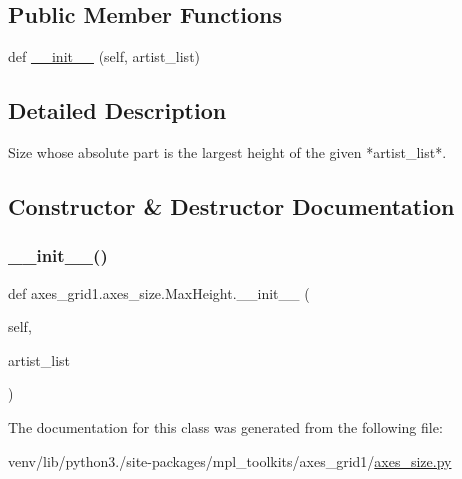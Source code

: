 \subsection*{Public Member Functions}
\begin{DoxyCompactItemize}
\item 
def \hyperlink{classaxes__grid1_1_1axes__size_1_1MaxHeight_a203fc68a5ed81a9d932896d10b47048a}{\+\_\+\+\_\+init\+\_\+\+\_\+} (self, artist\+\_\+list)
\end{DoxyCompactItemize}


\subsection{Detailed Description}
\begin{DoxyVerb}Size whose absolute part is the largest height of the given *artist_list*.
\end{DoxyVerb}
 

\subsection{Constructor \& Destructor Documentation}
\mbox{\label{classaxes__grid1_1_1axes__size_1_1MaxHeight_a203fc68a5ed81a9d932896d10b47048a}} 
\subsubsection{\texorpdfstring{\+\_\+\+\_\+init\+\_\+\+\_\+()}{\_\_init\_\_()}}
{\footnotesize\ttfamily def axes\+\_\+grid1.\+axes\+\_\+size.\+Max\+Height.\+\_\+\+\_\+init\+\_\+\+\_\+ (\begin{DoxyParamCaption}\item[{}]{self,  }\item[{}]{artist\+\_\+list }\end{DoxyParamCaption})}



The documentation for this class was generated from the following file\+:\begin{DoxyCompactItemize}
\item 
venv/lib/python3./site-\/packages/mpl\+\_\+toolkits/axes\+\_\+grid1/\hyperlink{_2axes__size_8py}{axes\+\_\+size.\+py}\end{DoxyCompactItemize}
